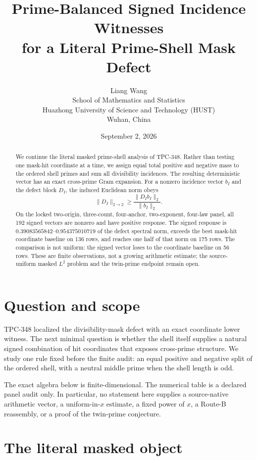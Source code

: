 \documentclass[10pt]{article}
\title{Prime-Balanced Signed Incidence Witnesses\\
       for a Literal Prime-Shell Mask Defect}
\author{Liang Wang\\
School of Mathematics and Statistics\\
Huazhong University of Science and Technology (HUST)\\
Wuhan, China}
\date{September 2, 2026}
\begin{document}
\maketitle

\begin{abstract}
We continue the literal masked prime-shell analysis of TPC-348.  Rather than
testing one mask-hit coordinate at a time, we assign equal total positive and
negative mass to the ordered shell primes and sum all divisibility incidences.
The resulting deterministic vector has an exact cross-prime Gram expansion.
For a nonzero incidence vector $b_I$ and the defect block $D_I$, the induced
Euclidean norm obeys
\[
 \|D_I\|_{2\to2}\geq \frac{\|D_Ib_I\|_2}{\|b_I\|_2}.
\]
On the locked two-origin, three-count, four-anchor, two-exponent, four-law
panel, all 192 signed vectors are nonzero and have positive response.  The
signed response is $0.39083565842$--$0.954375010719$ of the defect spectral
norm, exceeds the best mask-hit coordinate baseline on 136 rows, and reaches
one half of that norm on 175 rows.  The comparison is not uniform: the signed
vector loses to the coordinate baseline on 56 rows.  These are finite
observations, not a growing arithmetic estimate; the source-uniform masked
$L^2$ problem and the twin-prime endpoint remain open.
\end{abstract}

\section{Question and scope}

TPC-348 localized the divisibility-mask defect with an exact coordinate lower
witness.  The next minimal question is whether the shell itself supplies a
natural signed combination of hit coordinates that exposes cross-prime
structure.  We study one rule fixed before the finite audit: an equal positive
and negative split of the ordered shell, with a neutral middle prime when the
shell length is odd.

The exact algebra below is finite-dimensional.  The numerical table is a
declared panel audit only.  In particular, no statement here supplies a
source-native arithmetic vector, a uniform-in-$x$ estimate, a fixed power of
$x$, a Route-B reassembly, or a proof of the twin-prime conjecture.

\section{The literal masked object}
\end{document}
